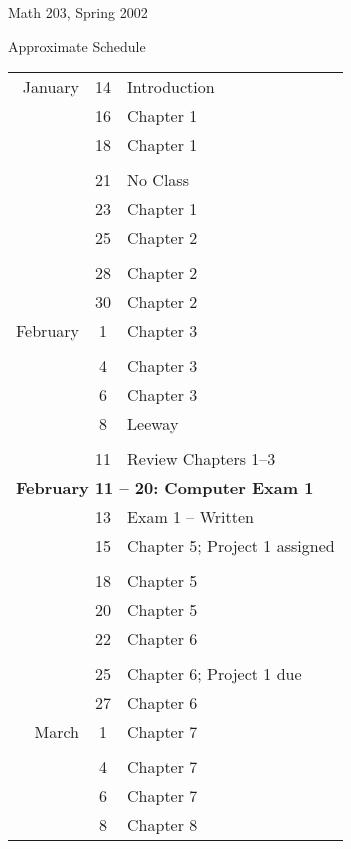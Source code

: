 \documentclass[11pt]{article}
\begin{document}
\centerline{\bigbf Math 203, Spring 2002}
\smallskip
\centerline{\bigbf Approximate Schedule}
\bigskip

\begin{minipage}[b]{3in}
\begin{tabular}{rcl}
January &14 & Introduction \\
&16 & Chapter 1 \\
&18 & Chapter 1 \\
&&\\
&21 & No Class\\
&23 & Chapter 1 \\
&25 & Chapter 2 \\
&\\
&28 & Chapter 2  \\
&30 & Chapter 2 \\
February&1 & Chapter 3 \\
&&\\
&4 & Chapter 3  \\
&6 & Chapter 3 \\
&8 & Leeway \\
&&\\
&11 & Review Chapters 1--3 \\
\multicolumn{3}{l}{\bf February 11 -- 20: Computer Exam 1}\\
&13 & Exam 1 -- Written\\
&15 & Chapter 5; Project 1 assigned \\
&&\\
&18 & Chapter 5 \\
&20 & Chapter 5 \\
&22 & Chapter 6 \\
&&\\
&25 & Chapter 6; Project 1 due \\
&27 & Chapter 6 \\
March&1 & Chapter 7 \\
&&\\
&4 & Chapter 7 \\
&6 & Chapter 7 \\
&8 & Chapter 8 
\end{tabular}
\end{minipage}
\end{document}
